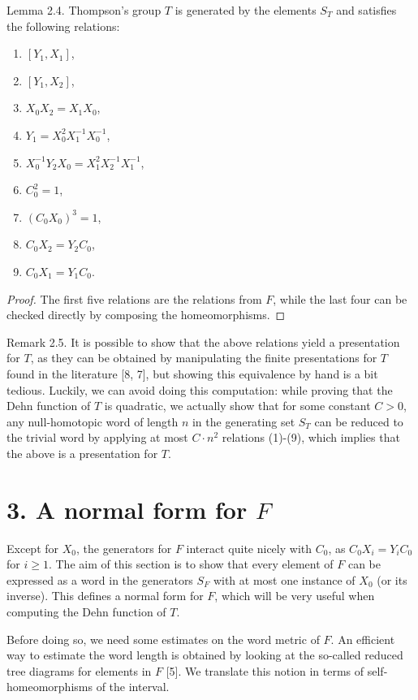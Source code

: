 \begin{authorstatement}{Lemma 2.4.}
Thompson's group $T$ is generated by the elements $S_T$ and satisfies the following relations:
\end{authorstatement}
\begin{enumerate}
\item $[Y_1,X_1]$,
\item $[Y_1,X_2]$,
\item $X_0X_2=X_1X_0$,
\item $Y_1=X_0^2X_1^{-1}X_0^{-1}$,
\item $X_0^{-1}Y_2X_0=X_1^2X_2^{-1}X_1^{-1}$,
\item $C_0^2=1$,
\item $(C_0X_0)^3=1$,
\item $C_0X_2=Y_2C_0$,
\item $C_0X_1=Y_1C_0$.
\end{enumerate}
\begin{proof}
The first five relations are the relations from $F$, while the last four can be checked directly by composing the homeomorphisms.
\end{proof}
\begin{authorremark}{Remark 2.5.}
It is possible to show that the above relations yield a presentation for $T$, as they can be obtained by manipulating the finite presentations for $T$ found in the literature [8, 7], but showing this equivalence by hand is a bit tedious. Luckily, we can avoid doing this computation: while proving that the Dehn function of $T$ is quadratic, we actually show that for some constant $C>0$, any null-homotopic word of length $n$ in the generating set $S_T$ can be reduced to the trivial word by applying at most $C\cdot n^2$ relations (1)-(9), which implies that the above is a presentation for $T$.
\end{authorremark}
\section*{3. A normal form for $F$}
Except for $X_0$, the generators for $F$ interact quite nicely with $C_0$, as $C_0X_i=Y_iC_0$ for $i\ge1$. The aim of this section is to show that every element of $F$ can be expressed as a word in the generators $S_F$ with at most one instance of $X_0$ (or its inverse). This defines a normal form for $F$, which will be very useful when computing the Dehn function of $T$.

Before doing so, we need some estimates on the word metric of $F$. An efficient way to estimate the word length is obtained by looking at the so-called reduced tree diagrams for elements in $F$ [5]. We translate this notion in terms of self-homeomorphisms of the interval.

